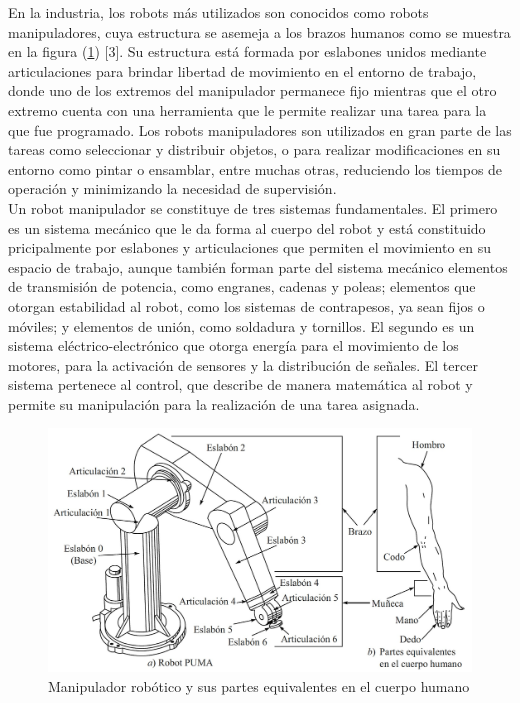 En la industria, los robots más utilizados son conocidos como robots manipuladores,
cuya estructura se asemeja a los brazos humanos como se muestra en la figura (\ref{robot1}) [3]. Su estructura está formada por eslabones unidos mediante articulaciones para brindar
libertad de movimiento en el entorno de trabajo, donde uno de los extremos del manipulador permanece fijo mientras que el otro extremo cuenta con una herramienta que le permite realizar una tarea para la que fue programado. Los robots manipuladores son utilizados en gran parte de las tareas como seleccionar y distribuir objetos, o para realizar modificaciones en su entorno como pintar o ensamblar, entre muchas otras, reduciendo los tiempos de operación y minimizando la necesidad de supervisión.
\\

Un robot manipulador se constituye de tres sistemas fundamentales. El primero es un sistema mecánico que le da forma al cuerpo del robot y está constituido pricipalmente por eslabones y articulaciones que permiten el movimiento en su espacio de trabajo, aunque también forman parte del sistema mecánico elementos de transmisión de potencia, como engranes, cadenas y poleas; elementos que otorgan estabilidad al robot, como los sistemas de contrapesos, ya sean fijos o móviles; y elementos de unión, como soldadura y tornillos. El segundo es un sistema eléctrico-electrónico que otorga energía para el movimiento de los motores, para la activación de sensores y la distribución de señales. El tercer sistema pertenece al control, que describe de manera matemática al robot y permite su manipulación para la realización de una tarea asignada.

\begin{figure}
	\centering
	\includegraphics[scale=0.3]{Capitulo1/figs/Robot.jpg}      %
	\caption{Manipulador robótico y sus partes equivalentes en el cuerpo humano}            %
	\label{robot1}                            %
\end{figure}

